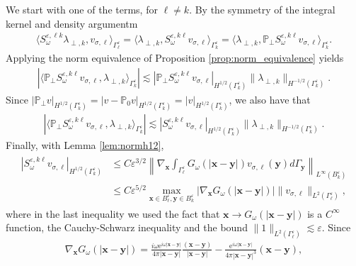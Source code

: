 \documentclass[]{article}
\numberwithin{equation}{section}
\numberwithin{theorem}{section}
\numberwithin{lemma}{section}
\numberwithin{corollary}{section}
\numberwithin{proposition}{section}
\numberwithin{definition}{section}
\newcommand{\bx}{\boldsymbol{x}}
\newcommand{\by}{\boldsymbol{y}}
\newcommand{\re}{\varepsilon}
\renewcommand{\vec}{\boldsymbol}
\begin{document}
	We start with one of the terms, for $\ell\neq k$. By the symmetry of the integral kernel and density argumentm
	\begin{align*}%
		\langle S_{\omega}^{\re,\ell k}\lambda_{\perp,k}, v_{\sigma,\ell}\rangle_{\Gamma^{\re}_{\ell}}=\langle \lambda_{\perp,k}, S_{\omega}^{\re,k \ell}v_{\sigma,\ell}\rangle_{\Gamma^{\re}_k}=\langle \lambda_{\perp,k}, \mathbb{P}_{\perp}S_{\omega}^{\re,k \ell}v_{\sigma,\ell}\rangle_{\Gamma^{\re}_k}.
	\end{align*}
	Applying the norm equivalence of Proposition \ref{prop:norm_equivalence} yields
	\begin{equation}
		\label{eq:somega0}
		\begin{aligned}
			|\langle \mathbb{P}_{\perp}S_{\omega}^{\re,k \ell}v_{\sigma,\ell},  \lambda_{\perp,k} \rangle_{\Gamma^{\re}_k}| \lesssim 
			|\mathbb{P}_{\perp}S_{\omega}^{\re,k\ell}v_{\sigma,\ell}|_{H^{1/2}(\Gamma^{\re}_k)}\|\lambda_{\perp,k}\|_{H^{-1/2}(\Gamma^{\re}_k)}.
		\end{aligned}
	\end{equation}
	Since $|\mathbb{P}_{\perp}v|_{H^{1/2}(\Gamma^{\re}_k)}=|v-\mathbb{P}_0v|_{H^{1/2}(\Gamma^{\re}_k)}=|v|_{H^{1/2}(\Gamma^{\re}_k)}$, we also have that 
	\begin{align*}%
		|\langle \mathbb{P}_{\perp}S_{\omega}^{\re,k \ell}v_{\sigma,\ell},  \lambda_{\perp,k} \rangle_{\Gamma^{\re}_k}| \lesssim 
		|S_{\omega}^{\re,k\ell}v_{\sigma,\ell}|_{H^{1/2}(\Gamma^{\re}_k)}\|\lambda_{\perp,k}\|_{H^{-1/2}(\Gamma^{\re}_k)}.
	\end{align*}
	Finally, with Lemma \ref{lem:normh12}, 
	\begin{align}
		\label{eq:somega}	
		\begin{split}
			|S_{\omega}^{\re,k\ell}v_{\sigma,\ell}|_{H^{1/2}(\Gamma^{\re}_k)} &\leq C \varepsilon^{3/2}\left\|\nabla_{\vec{x}}\int_{\Gamma_{\ell}^{\re}}G_{\omega}(|\bx-\by|)v_{\sigma,\ell}(\vec{y})d\Gamma_{\vec{y}}\right\|_{L^{\infty}(B_k^{\re})} \\
			&\leq C \varepsilon^{5/2}\max_{\vec{x}\in B_{\ell}^{\re}, \vec{y}\in B_k^{\re}}|\nabla_{\vec{x}}G_{\omega}(|\vec{x}-\vec{y}|)|\|v_{\sigma, {\ell}}\|_{L^2(\Gamma^{\re}_{\ell})},
		\end{split}
	\end{align}
	where in the last inequality we used the fact that $\vec{x}\rightarrow G_{\omega}(|\vec{x}-\vec{y}|)$ is a $C^{\infty}$ function, the Cauchy-Schwarz inequality and the bound $\|1\|_{L^2(\Gamma^{\re}_{\ell})}\lesssim \varepsilon$. Since 
	\begin{align*}%
		\nabla_{\bx} G_{\omega}(|\bx-\by|)=\frac{i\omega \mathrm{e}^{i\omega|\bx-\by|}}{4\pi|\bx-\by|}\frac{(\bx-\by)}{|\bx-\by|}-\frac{\mathrm{e}^{i\omega|\bx-\by|}}{4\pi|\bx-\by|^3}(\vec{x}-\vec{y}),
	\end{align*}
\end{document}
